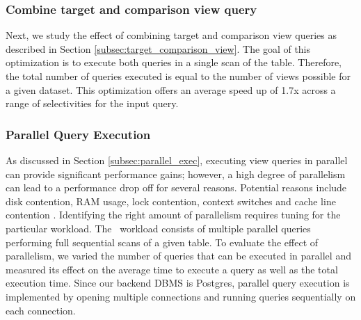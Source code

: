 \subsubsection{Combine target and comparison view query}
Next, we study the effect of combining target and comparison view queries as
described in Section \ref{subsec:target_comparison_view}. The goal of this
optimization is to execute both queries in a single scan of the table.
Therefore, the total number of queries executed is equal to the number of
views possible for a given dataset. This optimization offers an average speed up
of 1.7x across a range of selectivities for the input query.

% 
% 

\subsubsection {Parallel Query Execution}
As discussed in Section \ref{subsec:parallel_exec}, executing view queries in
parallel can provide significant performance gains; however, a high degree of
parallelism can lead to a performance drop off for several reasons. Potential
reasons include disk contention, RAM usage, lock contention, context switches
and cache line contention
\cite{Postgres_wiki}.
Identifying the right amount of parallelism requires tuning for the particular
workload. The \VizRecDB\ workload consists of multiple parallel queries performing
full sequential scans of a given table. To evaluate the
effect of parallelism, we varied the number of queries that can be executed in
parallel and measured its effect on the average time to execute a query as well
as the total execution time. Since our backend DBMS is Postgres, parallel query
execution is implemented by opening multiple connections and running queries
sequentially on each connection.

